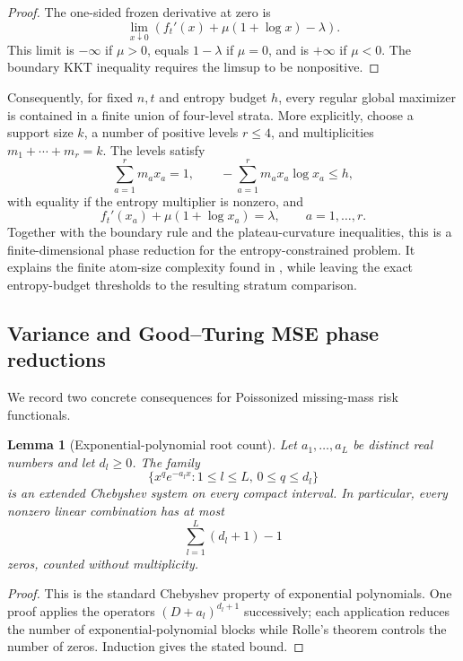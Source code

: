 \documentclass[11pt]{article}
\newtheorem{lemma}[theorem]{Lemma}
\theoremstyle{definition}
\begin{document}
\begin{proof}
The one-sided frozen derivative at zero is
\[
  \lim_{x\downarrow0}\left(f_t'(x)+\mu(1+\log x)-\lambda\right).
\]
This limit is $-\infty$ if $\mu>0$, equals $1-\lambda$ if $\mu=0$, and is $+\infty$ if $\mu<0$.  The boundary KKT inequality requires the limsup to be nonpositive.
\end{proof}

Consequently, for fixed $n,t$ and entropy budget $h$, every regular global maximizer is contained in a finite union of four-level strata.  More explicitly, choose a support size $k$, a number of positive levels $r\le4$, and multiplicities $m_1+\cdots+m_r=k$.  The levels satisfy
\[
  \sum_{a=1}^r m_a x_a=1,
  \qquad
  -\sum_{a=1}^r m_a x_a\log x_a\le h,
\]
with equality if the entropy multiplier is nonzero, and
\[
  f_t'(x_a)+\mu(1+\log x_a)=\lambda,
  \qquad a=1,\ldots,r.
\]
Together with the boundary rule and the plateau-curvature inequalities, this is a finite-dimensional phase reduction for the entropy-constrained problem.  It explains the finite atom-size complexity found in \cite{BKZ}, while leaving the exact entropy-budget thresholds to the resulting stratum comparison.

\subsection{Variance and Good--Turing MSE phase reductions}\label{subsec:variance-mse-phase}

We record two concrete consequences for Poissonized missing-mass risk functionals.

\begin{lemma}[Exponential-polynomial root count]\label{lem:exp-poly-ect}
Let $a_1,\ldots,a_L$ be distinct real numbers and let $d_l\ge0$.  The family
\[
  \{x^q e^{-a_l x}:1\le l\le L,\,0\le q\le d_l\}
\]
is an extended Chebyshev system on every compact interval.  In particular, every nonzero linear combination has at most
\[
  \sum_{l=1}^L(d_l+1)-1
\]
zeros, counted without multiplicity.
\end{lemma}

\begin{proof}
This is the standard Chebyshev property of exponential polynomials.  One proof applies the operators $(D+a_l)^{d_l+1}$ successively; each application reduces the number of exponential-polynomial blocks while Rolle's theorem controls the number of zeros.  Induction gives the stated bound.
\end{proof}
\end{document}
